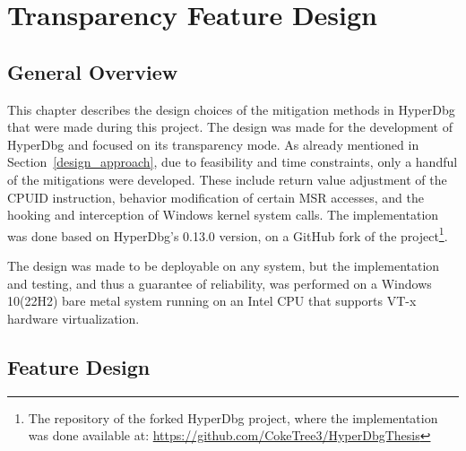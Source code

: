 \section{Transparency Feature Design}\label{s:design}

\subsection{General Overview}
This chapter describes the design choices of the mitigation methods in HyperDbg that were made during this project. The design was made for the development of HyperDbg and focused on its transparency mode. 
As already mentioned in Section~\ref{design_approach}, due to feasibility and time constraints, only a handful of the mitigations were developed. 
These include return value adjustment of the CPUID instruction, behavior modification of certain MSR accesses, and the hooking and interception of Windows kernel system calls. 
The implementation was done based on HyperDbg's 0.13.0 version, on a GitHub fork of the project\footnote{The repository of the forked HyperDbg project, where the implementation was done available at: \url{https://github.com/CokeTree3/HyperDbgThesis}}.

The design was made to be deployable on any system, but the implementation and testing, and thus a guarantee of reliability, 
was performed on a Windows 10(22H2) bare metal system running on an Intel CPU that supports VT-x hardware virtualization. 


\subsection{Feature Design}
